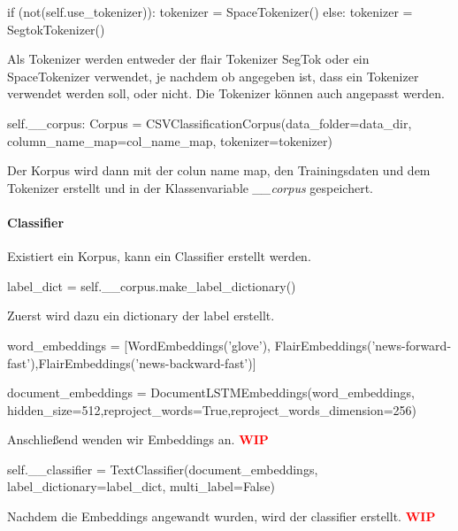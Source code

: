 \documentclass[10pt,a4paper]{article}
\begin{document}
\begin{python}
if (not(self.use_tokenizer)):
	tokenizer = SpaceTokenizer()
else:
	tokenizer = SegtokTokenizer()
\end{python}

Als Tokenizer werden entweder der flair Tokenizer SegTok oder ein SpaceTokenizer verwendet, je nachdem ob angegeben ist, dass ein Tokenizer verwendet werden soll, oder nicht. Die Tokenizer können auch angepasst werden.

\begin{python}
self.__corpus: Corpus = CSVClassificationCorpus(data_folder=data_dir,
    column_name_map=col_name_map,
    tokenizer=tokenizer)
\end{python}

Der Korpus wird dann mit der colun name map, den Trainingsdaten und dem Tokenizer erstellt und in der Klassenvariable \textit{\_\_corpus} gespeichert.

\paragraph{Classifier}

Existiert ein Korpus, kann ein Classifier erstellt werden.

\begin{python}
label_dict = self.__corpus.make_label_dictionary()
\end{python}

Zuerst wird dazu ein dictionary der label erstellt.

\begin{python}
word_embeddings = [WordEmbeddings('glove'), FlairEmbeddings('news-forward-fast'),FlairEmbeddings('news-backward-fast')]

document_embeddings = DocumentLSTMEmbeddings(word_embeddings, hidden_size=512,reproject_words=True,reproject_words_dimension=256)
\end{python}

Anschließend wenden wir Embeddings an. \textbf{\textcolor{red}{WIP}}

\begin{python}
self.__classifier = TextClassifier(document_embeddings, label_dictionary=label_dict, multi_label=False)
\end{python}

Nachdem die Embeddings angewandt wurden, wird der classifier erstellt. \textbf{\textcolor{red}{WIP}}



\end{document}

